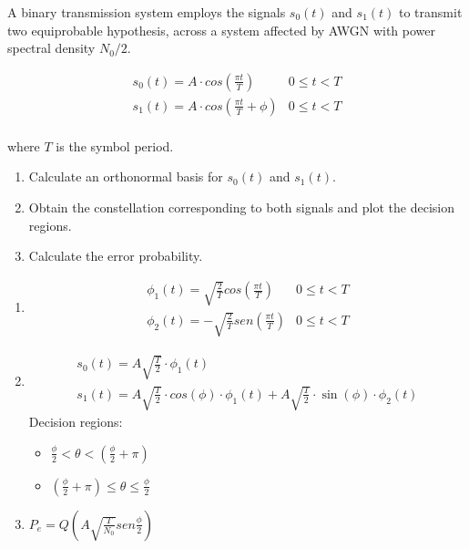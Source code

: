 \documentclass[idioma,boletin]{uah}
\begin{document}
{

	A binary transmission system employs the signals $s_0(t)$ and $s_1(t)$ to transmit two equiprobable hypothesis, across a system affected by AWGN with power spectral density $N_0/2$.

\begin{displaymath}
	\begin{array}{ll}
		s_0(t) = A \cdot cos\left ( \frac{\pi t}{T} \right ) & 0\leq t<T \\
		s_1(t) = A \cdot cos\left ( \frac{\pi t}{T} + \phi \right ) & 0\leq t<T \\
	\end{array}
\end{displaymath}

where $T$ is the symbol period.

\begin{enumerate}
	\item Calculate an orthonormal basis for $s_0(t)$ and $s_1(t)$.
	\item Obtain the constellation corresponding to both signals and plot the decision regions.
	\item Calculate the error probability.
\end{enumerate}

}
{

\begin{enumerate}
	\item \begin{displaymath}
		\begin{array}{ll}
			\phi_1(t) = \sqrt{\frac{2}{T}} cos \left ( \frac{\pi t}{T} \right ) & 0 \leq t < T \\
			\phi_2(t) = -\sqrt{\frac{2}{T}} sen \left ( \frac{\pi t}{T} \right ) & 0 \leq t < T 
		\end{array}
		\end{displaymath}
	\item \begin{displaymath}
		\begin{array}{l}
			s_0(t) = A \sqrt{\frac{T}{2}} \cdot\phi_1(t) \\
			s_1(t) = A \sqrt{\frac{T}{2}} \cdot cos(\phi) \cdot \phi_1(t) + A \sqrt{\frac{T}{2}} \cdot \sin(\phi) \cdot \phi_2(t)
		\end{array}
		\end{displaymath}
		Decision regions: 
		\begin{itemize}
			\item 	$\frac{\phi}{2} < \theta < (\frac{\phi}{2} + \pi)$
			\item 	$(\frac{\phi}{2} + \pi) \leq \theta \leq \frac{\phi}{2}$  
		\end{itemize}
	\item $P_e = Q\left ( A \sqrt{\frac{T}{N_0}} sen \frac{\phi}{2} \right )$
\end{enumerate}

}
\end{document}
